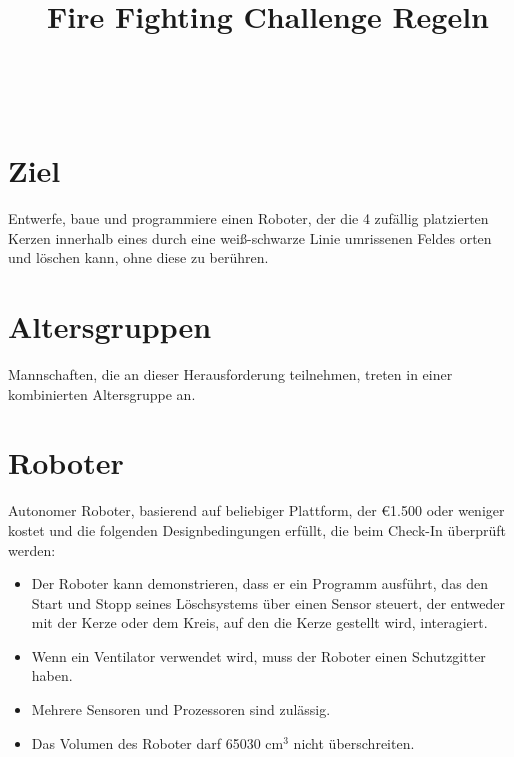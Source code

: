 \documentclass[a4paper,12pt]{article}
\begin{document}


\title{\tagYear\ Fire Fighting Challenge Regeln}

\makeatletter
\let\inserttitle\@title
\makeatother
\begin{center}
	\rrgerLogo
	\huge                      %
	\bfseries                   %
	\\
	\inserttitle
\end{center}
\section{Ziel}
Entwerfe, baue und programmiere einen Roboter, der die 4 zufällig platzierten Kerzen innerhalb eines durch eine weiß-schwarze Linie umrissenen Feldes orten und löschen kann, ohne diese zu berühren.
\section{Altersgruppen}
Mannschaften, die an dieser Herausforderung teilnehmen, treten in einer kombinierten Altersgruppe an.
\section{Roboter}
Autonomer Roboter, basierend auf beliebiger Plattform, der \euro{1.500}  oder weniger kostet und die folgenden Designbedingungen erfüllt, die beim Check-In überprüft werden:
\begin{itemize}
	\item Der Roboter kann demonstrieren, dass er ein Programm ausführt, das den Start und Stopp seines Löschsystems über einen Sensor steuert, der entweder mit der Kerze oder dem Kreis, auf den die Kerze gestellt wird, interagiert.
	\item Wenn ein Ventilator verwendet wird, muss der Roboter einen Schutzgitter haben.
	\item Mehrere Sensoren und Prozessoren sind zulässig.
	\item Das Volumen des Roboter darf 65030 cm$^{3}$ nicht überschreiten.
\end{itemize}
\end{document}
